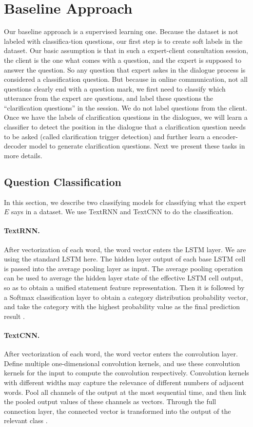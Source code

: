 \section{Baseline Approach}
\label{method}
Our baseline approach is a supervised learning one.
Because the dataset is not labeled with classifica-tion questions, our first step is to create soft 
labels in the dataset. Our basic assumption is that in such a expert-client consultation session, 
the client is the one what comes with a question, and the expert is supposed to answer the question. 
So any question that expert askes in the dialogue process is considered a classification question. 
But because in online communication, not all questions clearly end with a question mark, 
we first need to classify which utterance from the expert are questions, and label these questions the 
``clarification questions'' in the session.  We do not label questions from the client. 
Once we have the labels of
clarification questions in the dialogues, we will learn a classifier
to detect the position in the dialogue that a clarification question needs
to be asked (called clarification trigger detection) and
further learn a encoder-decoder model to generate clarification questions.
Next we present these tasks in more details.

\subsection{Question Classification}
\label{sec:qn}
In this section, we describe two classifying models for classifying what the expert $E$ says in a dataset. We use TextRNN and TextCNN to do the classification.

\paragraph{TextRNN.} 
After vectorization of each word, the word vector enters the LSTM layer. We are using the standard LSTM here. The hidden layer output of each base LSTM cell is passed into the average pooling layer as input. The average pooling operation can be used to average the hidden layer state of the effective LSTM cell output, so as to obtain a unified statement feature representation. Then it is followed by a Softmax classification layer to obtain a category distribution probability vector, and take the category with the highest probability value as the final prediction result \citep{DBLP:conf/aaai/LaiXLZ15}.

\paragraph{TextCNN.} 
After vectorization of each word, the word vector enters the convolution layer. Define multiple one-dimensional convolution kernels, and use these convolution kernels for the input to compute the convolution respectively. Convolution kernels with different widths may capture the relevance of different numbers of adjacent words. Pool all channels of the output at the most sequential time, and then link the pooled output values of these channels as vectors. Through the full connection layer, the connected vector is transformed into the output of the relevant class \citep{DBLP:conf/emnlp/Kim14}.

